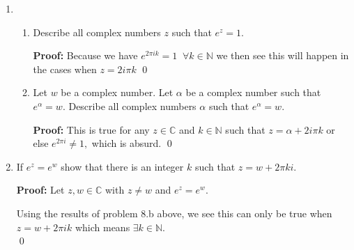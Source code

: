 \begin{enumerate}
	      \begin{align*}
		      i & = e^{\sfrac{i\pi}{2}} \\
	      \end{align*}
	      So then:
	      \begin{align*}
		      i^{\sfrac{1}{4}} & = e^{(\sfrac{i \pi}{2})^{\sfrac{1}{4}}} \\
		                       & = e^{(\sfrac{i \pi}{8})}
	      \end{align*}
	      Which then just means $\theta = \sfrac{\pi}{8}$ and we can get the real and imaginary parts with:
	      \begin{align*}
		      x =                            & \cos{(\sfrac{\pi}{8})} \;\; \text{and} \;\; y = \sin{(\sfrac{\pi}{8})} \\
		      \\
		      \therefore \; i^{\sfrac{1}{4}} & = \cos{(\sfrac{\pi}{8})} + i\sin{(\sfrac{\pi}{8})}
	      \end{align*}
	      \qed


	\item
	      \begin{enumerate}
		      \item Describe all complex numbers $z$ such that $e^z = 1.$

		            \textbf{Proof:}
		            Because we have $e^{2\pi i k} = 1 \;\; \forall k \in \mathbb{N}$ we then see this will
		            happen in the cases when $ z = 2 i \pi k$
		            \qed


		      \item Let $w$ be a complex number. Let $\alpha$ be a complex number such that $e^{\alpha} = w.$
		            Describe all complex numbers $\alpha$ such that $e^\alpha = w.$

		            \textbf{Proof:}
		            This is true for any $z \in \mathbb{C}$ and $k \in \mathbb{N}$ such that
		            $z = \alpha + 2i \pi k$ or else $e^{2\pi i} \neq 1,$ which is absurd.
		            \qed
	      \end{enumerate}

	\item If $e^z = e^w$ show that there is an integer $k$ such that $z = w + 2\pi k i.$

	      \textbf{Proof:}
	      Let $z, w \in \mathbb{C}$ with $z \neq w$ and $e^z = e^w.$

	      Using the results of problem 8.b above, we see this can only be true when $z = w + 2\pi i k$ which
	      means $\exists k \in \mathbb{N}.$ \\
	      \qed


\end{enumerate}
